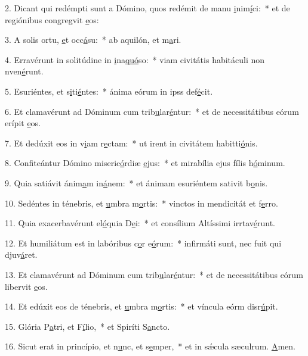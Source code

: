 2. Dicant qui redémpti sunt a Dómino, quos redémit de manu \uline{i}nim\uline{í}ci:~* et de regiónibus congregvit \uline{e}os:\par 
3. A solis ortu, \uline{e}t occ\uline{á}su:~* ab aquilón, et m\uline{a}ri.\par 
4. Erravérunt in solitúdine in \uline{i}na\uline{quó}so:~* viam civitátis habitáculi non nven\uline{é}runt.\par 
5. Esuriéntes, et s\uline{i}ti\uline{é}ntes:~* ánima eórum in ipss def\uline{é}cit.\par 
6. Et clamavérunt ad Dóminum cum trib\uline{u}lar\uline{é}ntur:~* et de necessitátibus eórum erípit \uline{e}os.\par 
7. Et dedúxit eos in v\uline{i}am r\uline{e}ctam:~* ut irent in civitátem habitti\uline{ó}nis.\par 
8. Confiteántur Dómino miseric\uline{ó}rdiæ \uline{e}jus:~* et mirabília ejus fílis h\uline{ó}minum.\par 
9. Quia satiávit ánim\uline{a}m in\uline{á}nem:~* et ánimam esuriéntem sativit b\uline{o}nis.\par 
10. Sedéntes in ténebris, et \uline{u}mbra m\uline{o}rtis:~* vinctos in mendicitát et f\uline{e}rro.\par 
11. Quia exacerbavérunt el\uline{ó}quia D\uline{e}i:~* et consílium Altíssimi irrtav\uline{é}runt.\par 
12. Et humiliátum est in labóribus c\uline{o}r e\uline{ó}rum:~* infirmáti sunt, nec fuit qui djuv\uline{á}ret.\par 
13. Et clamavérunt ad Dóminum cum trib\uline{u}lar\uline{é}ntur:~* et de necessitátibus eórum libervit \uline{e}os.\par 
14. Et edúxit eos de ténebris, et \uline{u}mbra m\uline{o}rtis:~* et víncula eórm disr\uline{ú}pit.\par 
15. Glória P\uline{a}tri, et F\uline{í}lio,~* et Spiríti S\uline{a}ncto.\par 
16. Sicut erat in princípio, et n\uline{u}nc, et s\uline{e}mper,~* et in sǽcula sæculrum. \uline{A}men.\par 
